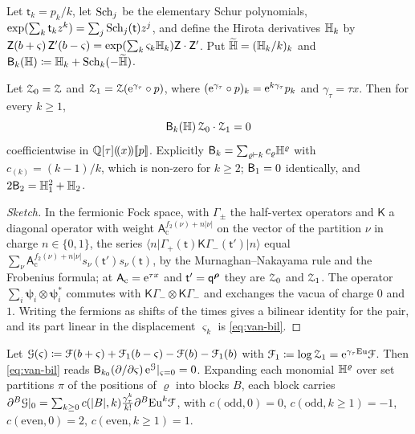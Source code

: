 Let $\mathsf{t}_k=p_k/k$, let $\mathrm{Sch}_j$ be the elementary Schur polynomials, $\exp(\sum_k\mathsf{t}_kz^k)=\sum_j\mathrm{Sch}_j(\mathsf{t})z^j$, and define the Hirota derivatives $\mathbb{H}_k$ by $\mathsf{Z}(b+\varsigma)\,\mathsf{Z}'(b-\varsigma)=\exp(\sum_k\varsigma_k\mathbb{H}_k)\mathsf{Z}\cdot\mathsf{Z}'$. Put $\widetilde{\mathbb{H}}=(\mathbb{H}_k/k)_k$ and $\mathsf{B}_k(\mathbb{H})\coloneqq\mathbb{H}_k+\mathrm{Sch}_k(-\widetilde{\mathbb{H}})$.

\begin{prop}[{\Lg{Proposition~8.15}}]\label{prop:van-bil}
Let $\mathcal{Z}_0=\mathcal{Z}$ and $\mathcal{Z}_1=\mathcal{Z}(\mathrm{e}^{\gamma_\tau}\circ p)$, where $(\mathrm{e}^{\gamma_\tau}\circ p)_k=\mathrm{e}^{k\gamma_\tau}p_k$ and $\gamma_\tau=\tau x$. Then for every $k\geq 1$,
\begin{equation}\label{eq:van-bil}
\mathsf{B}_k(\mathbb{H})\,\mathcal{Z}_0\cdot\mathcal{Z}_1=0
\end{equation}
coefficientwise in $\mathbb{Q}[\tau](\!(x)\!)[\![ p ]\!]$. Explicitly $\mathsf{B}_k=\sum_{\varrho\vdash k}c_\varrho\mathbb{H}^\varrho$ with $c_{(k)}=(k-1)/k$, which is non-zero for $k\geq 2$; $\mathsf{B}_1=0$ identically, and $2\mathsf{B}_2=\mathbb{H}_1^2+\mathbb{H}_2$.
\end{prop}

\begin{proof}[Sketch]
In the fermionic Fock space, with $\Gamma_\pm$ the half-vertex operators and $\mathsf{K}$ a diagonal operator with weight $\mathsf{A}_{\mathrm{c}}^{f_2(\nu)+n\lvert\nu\rvert}$ on the vector of the partition $\nu$ in charge $n\in\{0,1\}$, the series $\langle n\rvert\Gamma_+(\mathsf{t})\mathsf{K}\Gamma_-(\mathsf{t}')\lvert n\rangle$ equal $\sum_\nu\mathsf{A}_{\mathrm{c}}^{f_2(\nu)+n\lvert\nu\rvert}s_\nu(\mathsf{t}')s_\nu(\mathsf{t})$, by the Murnaghan--Nakayama rule and the Frobenius formula; at $\mathsf{A}_{\mathrm{c}}=\mathrm{e}^{\tau x}$ and $\mathsf{t}'=\mathsf{q}^{\boldsymbol{\rho}}$ they are $\mathcal{Z}_0$ and $\mathcal{Z}_1$. The operator $\sum_i\boldsymbol{\psi}_i\otimes\boldsymbol{\psi}^*_i$ commutes with $\mathsf{K}\Gamma_-\otimes\mathsf{K}\Gamma_-$ and exchanges the vacua of charge $0$ and $1$. Writing the fermions as shifts of the times gives a bilinear identity for the pair, and its part linear in the displacement $\varsigma_k$ is \eqref{eq:van-bil}.
\end{proof}

Let $\mathcal{G}(\varsigma)\coloneqq\mathcal{F}(b+\varsigma)+\mathcal{F}_1(b-\varsigma)-\mathcal{F}(b)-\mathcal{F}_1(b)$ with $\mathcal{F}_1\coloneqq\log\mathcal{Z}_1=\mathrm{e}^{\gamma_\tau\mathrm{Eu}}\mathcal{F}$. Then \eqref{eq:van-bil} reads $\mathsf{B}_{k_0}(\partial/\partial\varsigma)\,\mathrm{e}^{\mathcal{G}}|_{\varsigma=0}=0$. Expanding each monomial $\mathbb{H}^\varrho$ over set partitions $\pi$ of the positions of $\varrho$ into blocks $B$, each block carries $\partial^B\mathcal{G}|_0=\sum_{k\geq0}c(\lvert B\rvert,k)\frac{\gamma_\tau^k}{k!}\partial^B\mathrm{Eu}^k\mathcal{F}$, with $c(\mathrm{odd},0)=0$, $c(\mathrm{odd},k\geq 1)=-1$, $c(\mathrm{even},0)=2$, $c(\mathrm{even},k\geq 1)=1$.

